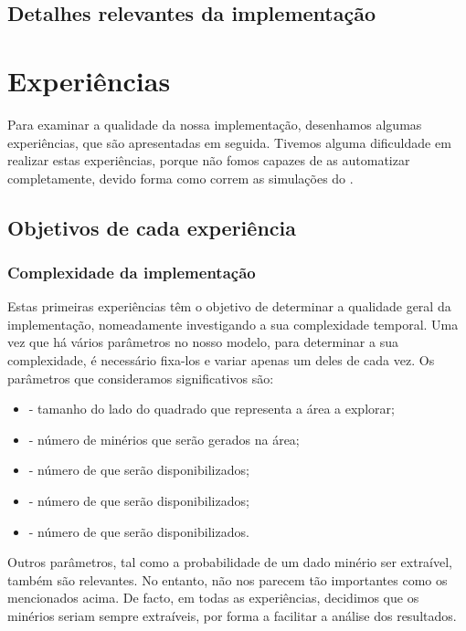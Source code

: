 \documentclass[12pt]{report}
\begin{document}

\section{Detalhes relevantes da implementação}


\chapter{Experiências}

Para examinar a qualidade da nossa implementação, desenhamos algumas experiências, que são apresentadas em seguida. Tivemos alguma dificuldade em realizar estas experiências, porque não fomos capazes de as automatizar completamente, devido forma como correm as simulações do \repast.

\section{Objetivos de cada experiência}

\subsection{Complexidade da implementação}

Estas primeiras experiências têm o objetivo de determinar a qualidade geral da implementação, nomeadamente investigando a sua complexidade temporal. Uma vez que há vários parâmetros no nosso modelo, para determinar a sua complexidade, é necessário fixa-los e variar apenas um deles de cada vez. Os parâmetros que consideramos significativos são:
\begin{itemize}
	\item \size - tamanho do lado do quadrado que representa a área a explorar;
	\item \minerals - número de minérios que serão gerados na área;
	\item \spotters - número de \spotters que serão disponibilizados;
	\item \producers - número de \producers que serão disponibilizados;
	\item \transporters - número de \transporters que serão disponibilizados.
\end{itemize}

Outros parâmetros, tal como a probabilidade de um dado minério ser extraível, também são relevantes. No entanto, não nos parecem tão importantes como os mencionados acima. De facto, em todas as experiências, decidimos que os minérios seriam sempre extraíveis, por forma a facilitar a análise dos resultados. 
\end{document}
